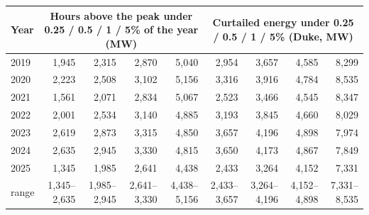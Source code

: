 \begin{tabular}{lrrrrrrrr}
\toprule
Year & \multicolumn{4}{c}{Hours above the peak under 0.25 / 0.5 / 1 / 5\% of the year (MW)} & \multicolumn{4}{c}{Curtailed energy under 0.25 / 0.5 / 1 / 5\% (Duke, MW)} \\
\midrule
2019 & 1,945 & 2,315 & 2,870 & 5,040 & 2,954 & 3,657 & 4,585 & 8,299 \\
2020 & 2,223 & 2,508 & 3,102 & 5,156 & 3,316 & 3,916 & 4,784 & 8,535 \\
2021 & 1,561 & 2,071 & 2,834 & 5,067 & 2,523 & 3,466 & 4,545 & 8,347 \\
2022 & 2,001 & 2,534 & 3,140 & 4,885 & 3,193 & 3,845 & 4,660 & 8,029 \\
2023 & 2,619 & 2,873 & 3,315 & 4,850 & 3,657 & 4,196 & 4,898 & 7,974 \\
2024 & 2,635 & 2,945 & 3,330 & 4,815 & 3,650 & 4,173 & 4,867 & 7,849 \\
2025 & 1,345 & 1,985 & 2,641 & 4,438 & 2,433 & 3,264 & 4,152 & 7,331 \\
\midrule
range & 1,345--2,635 & 1,985--2,945 & 2,641--3,330 & 4,438--5,156 & 2,433--3,657 & 3,264--4,196 & 4,152--4,898 & 7,331--8,535 \\
\bottomrule
\end{tabular}